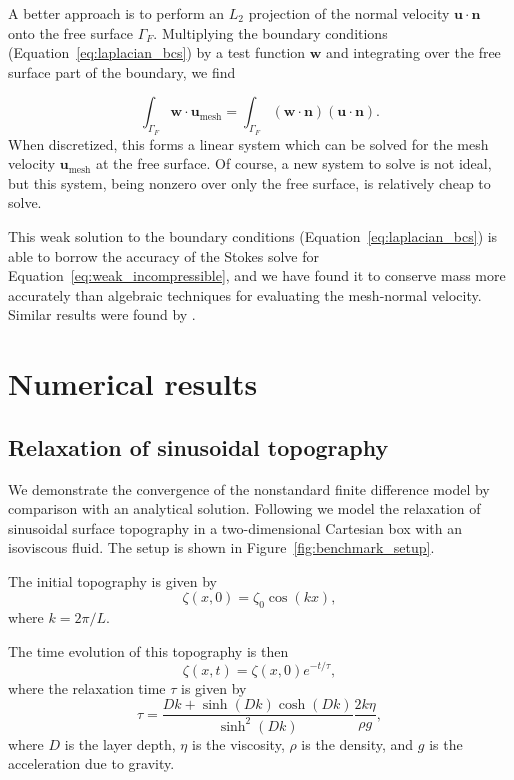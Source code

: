 \documentclass[preprint,12pt,authoryear]{elsarticle}
\begin{document}
A better approach is to perform an $L_2$ projection of the normal velocity $\mathbf{u}\cdot\mathbf{n}$
onto the free surface $\Gamma_F$. Multiplying the boundary conditions 
(Equation~\eqref{eq:laplacian_bcs}) by a test function $\mathbf{w}$ and integrating over the free
surface part of the boundary, we find

\begin{equation}
\int_{\Gamma_F} \mathbf{w} \cdot \mathbf{u}_\mathrm{mesh} = 
\int_{\Gamma_F} \left( \mathbf{w \cdot n } \right) \left( \mathbf{u \cdot n} \right).
\end{equation}
When discretized, this forms a linear system which can be solved for the mesh velocity $\mathbf{u}_\mathrm{mesh}$ at the 
free surface. Of course, a new system to solve is not ideal, but this system, being nonzero 
over only the free surface, is relatively cheap to solve.

This weak solution to the boundary conditions (Equation~\eqref{eq:laplacian_bcs}) is able to borrow
the accuracy of the Stokes solve for Equation~\eqref{eq:weak_incompressible}, and we have 
found it to conserve mass more accurately than algebraic techniques for evaluating the mesh-normal velocity.
Similar results were found by \citet{fullsack1995arbitrary}.

\section{Numerical results}
\label{sec:results}

\subsection{Relaxation of sinusoidal topography}
\label{sec:topography_relaxation}

We demonstrate the convergence of the nonstandard finite difference model by comparison 
with an analytical solution. Following \citet{kramer2012implicit} we model the relaxation
of sinusoidal surface topography in a two-dimensional Cartesian box with an isoviscous fluid.
The setup is shown in Figure~\ref{fig:benchmark_setup}.

The initial topography is given by
\begin{equation}
\zeta(x,0) = \zeta_0 \cos\left( k x \right),
\end{equation}
where $k = 2 \pi / L$.

The time evolution of this topography is then
\begin{equation}
\zeta(x, t) = \zeta(x,0) e^{-t/\tau},
\end{equation}
where the relaxation time $\tau$ is given by
\begin{equation}
\tau = \frac{D k + \sinh(D k) \cosh(D k)}{ \sinh^2 (D k) } \frac{2 k \eta}{\rho g},
\end{equation}
where $D$ is the layer depth, $\eta$ is the viscosity, $\rho$ is the density, and $g$ is the acceleration due to gravity.
\end{document}
